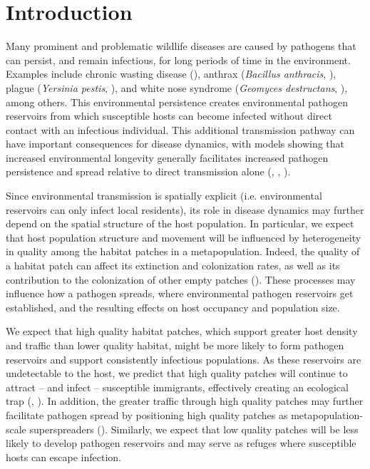 \documentclass{article}
\begin{document}
\section{Introduction}
\label{intro}

Many prominent and problematic wildlife diseases are caused by pathogens that can persist, and remain infectious, for long periods of time in the environment.  Examples include chronic wasting disease (\cite{Miller2006}), anthrax (\emph{Bacillus anthracis}, \cite{Dragon1995}), plague (\emph{Yersinia pestis}, \cite{Eisen2008}), and white nose syndrome (\emph{Geomyces destructans}, \cite{Lindner2011}), among others.  This environmental persistence creates environmental pathogen reservoirs from which susceptible hosts can become infected without direct contact with an infectious individual.  This additional transmission pathway can have important consequences for disease dynamics, with models showing that increased environmental longevity generally facilitates increased pathogen persistence and spread relative to direct transmission alone (\cite{Almberg2011}, \cite{Sharp2011}, \cite{Breban2009}). 

Since environmental transmission is spatially explicit (i.e. environmental reservoirs can only infect local residents), its role in disease dynamics may further depend on the spatial structure of the host population.  In particular, we expect that host population structure and movement will be influenced by heterogeneity in quality among the habitat patches in a metapopulation.  Indeed, the quality of a habitat patch can affect its extinction and colonization rates, as well as its contribution to the colonization of other empty patches (\cite{Moilanen1998}).  These processes may influence how a pathogen spreads, where environmental pathogen reservoirs get established, and the resulting effects on host occupancy and population size.  

We expect that high quality habitat patches, which support greater host density and traffic than lower quality habitat, might be more likely to form pathogen reservoirs and support consistently infectious populations.  As these reservoirs are undetectable to the host, we predict that high quality patches will continue to attract -- and infect -- susceptible immigrants, effectively creating an ecological trap (\cite{Robertson2006}, \cite{Almberg2011}).  In addition, the greater traffic through high quality patches may further facilitate pathogen spread by positioning high quality patches as metapopulation-scale superspreaders (\cite{Paull2012}).  Similarly, we expect that low quality patches will be less likely to develop pathogen reservoirs and may serve as refuges where susceptible hosts can escape infection.  
\end{document}
